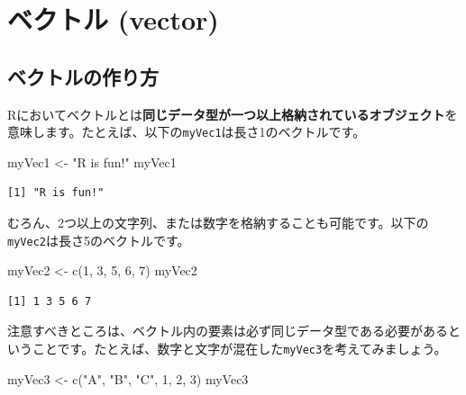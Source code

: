 \documentclass[
  a4paper,
  pandoc,
  ja=standard,
  jafont=haranoaji]{bxjsbook}
\newenvironment{Shaded}{\begin{snugshade}}{\end{snugshade}}
\newcommand{\DecValTok}[1]{\textcolor[rgb]{0.68,0.00,0.00}{#1}}
\newcommand{\FunctionTok}[1]{\textcolor[rgb]{0.28,0.35,0.67}{#1}}
\newcommand{\NormalTok}[1]{\textcolor[rgb]{0.00,0.48,0.65}{#1}}
\newcommand{\OtherTok}[1]{\textcolor[rgb]{0.00,0.48,0.65}{#1}}
\newcommand{\StringTok}[1]{\textcolor[rgb]{0.13,0.47,0.30}{#1}}
\begin{document}
\hypertarget{sec-datastructure_vector}{%
\section{ベクトル (vector)}\label{sec-datastructure_vector}}

\hypertarget{ux30d9ux30afux30c8ux30ebux306eux4f5cux308aux65b9}{%
\subsection{ベクトルの作り方}\label{ux30d9ux30afux30c8ux30ebux306eux4f5cux308aux65b9}}

Rにおいてベクトルとは\textbf{同じデータ型が一つ以上格納されているオブジェクト}を意味します。たとえば、以下の\texttt{myVec1}は長さ1のベクトルです。

\begin{Shaded}
\begin{Highlighting}[numbers=left,,]
\NormalTok{myVec1 }\OtherTok{\textless{}{-}} \StringTok{"R is fun!"}
\NormalTok{myVec1}
\end{Highlighting}
\end{Shaded}

\begin{verbatim}
[1] "R is fun!"
\end{verbatim}

むろん、2つ以上の文字列、または数字を格納することも可能です。以下の\texttt{myVec2}は長さ5のベクトルです。

\begin{Shaded}
\begin{Highlighting}[numbers=left,,]
\NormalTok{myVec2 }\OtherTok{\textless{}{-}} \FunctionTok{c}\NormalTok{(}\DecValTok{1}\NormalTok{, }\DecValTok{3}\NormalTok{, }\DecValTok{5}\NormalTok{, }\DecValTok{6}\NormalTok{, }\DecValTok{7}\NormalTok{)}
\NormalTok{myVec2}
\end{Highlighting}
\end{Shaded}

\begin{verbatim}
[1] 1 3 5 6 7
\end{verbatim}

注意すべきところは、ベクトル内の要素は必ず同じデータ型である必要があるということです。たとえば、数字と文字が混在した\texttt{myVec3}を考えてみましょう。

\begin{Shaded}
\begin{Highlighting}[numbers=left,,]
\NormalTok{myVec3 }\OtherTok{\textless{}{-}} \FunctionTok{c}\NormalTok{(}\StringTok{"A"}\NormalTok{, }\StringTok{"B"}\NormalTok{, }\StringTok{"C"}\NormalTok{, }\DecValTok{1}\NormalTok{, }\DecValTok{2}\NormalTok{, }\DecValTok{3}\NormalTok{)}
\NormalTok{myVec3}
\end{Highlighting}
\end{Shaded}
\end{document}
